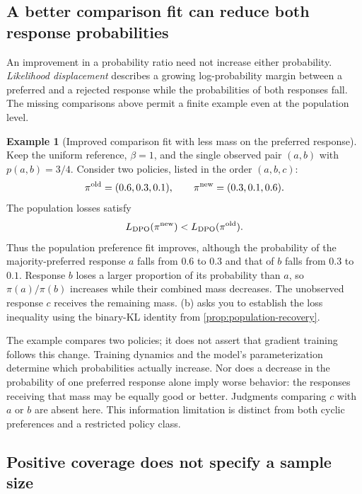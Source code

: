 \documentclass[11pt,twoside]{article}
\theoremstyle{definition}
\newtheorem{example}[theorem]{Example}
\theoremstyle{remark}
\begin{document}
\subsection{A better comparison fit can reduce both response probabilities}
\label{sec:displacement}

An improvement in a probability ratio need not increase either probability.
\emph{Likelihood displacement} describes a growing log-probability margin
between a preferred and a rejected response while the probabilities of both
responses fall. The missing comparisons above permit a finite example even
at the population level.

\begin{example}[Improved comparison fit with less mass on the preferred response]
\label{ex:displacement}
Keep the uniform reference, $\beta=1$, and the single observed pair $(a,b)$
with $p(a,b)=3/4$. Consider two policies, listed in the order $(a,b,c)$:
\[
 \pi^{\rm old}=(0.6,0.3,0.1),\qquad
 \pi^{\rm new}=(0.3,0.1,0.6).
\]
The population losses satisfy
\[
 L_{\rm DPO}(\pi^{\rm new})<L_{\rm DPO}(\pi^{\rm old}).
\]
Thus the population preference fit improves, although the probability of
the majority-preferred response $a$ falls from $0.6$ to $0.3$ and that of
$b$ falls from $0.3$ to $0.1$. Response $b$ loses a larger proportion of
its probability than $a$, so $\pi(a)/\pi(b)$ increases while their combined
mass decreases. The unobserved response $c$ receives the remaining mass.
(b) asks you to establish the loss
inequality using the binary-KL identity from \cref{prop:population-recovery}.
\end{example}

The example compares two policies; it does not assert that gradient training
follows this change. Training dynamics and the model's parameterization
determine which probabilities actually increase. Nor does a decrease in
the probability of one preferred response alone imply worse behavior:
the responses receiving that mass may be equally good or better. Judgments
comparing $c$ with $a$ or $b$ are absent here. This information limitation
is distinct from both cyclic preferences and a restricted policy class.

\subsection{Positive coverage does not specify a sample size}
\end{document}
